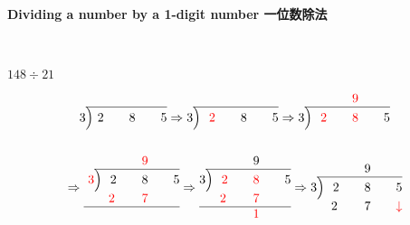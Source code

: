 \paragraph{Dividing a number by a 1-digit number 一位数除法}
\ \ 

\begin{example}
$148\div 21$
\end{example}
\begin{solution}
$$
\arraycolsep=0pt
\begin{array}{rccc}
&&&\\
\cline{2-4}
3&{\Big)}\ 2\quad&\quad8\quad&\quad5\\
&&&
\end{array}
\Rightarrow
\begin{array}{rccc}
&&&\\
\cline{2-4}
3&{\Big)}\ {\color{red}\ 2}\quad&\quad8\quad&\quad5\\
&&&
\end{array}
\Rightarrow
\begin{array}{rccc}
&&\quad {\color{red}9}\quad&\\
\cline{2-4}
3&{\Big)}\ {\color{red}\ 2}\quad&\quad{\color{red}8}\quad&\quad5\\
&&&
\end{array}
$$
$$
\arraycolsep=0pt
\Rightarrow
\begin{array}{rccc}
&&\quad {\color{red}9}\quad&\\
\cline{2-4}
{\color{red}\ 3}&{\Big)}\ \ 2\quad&\quad8\quad&\quad5\\
&\quad{\color{red}2}\quad&\quad{\color{red}7}\quad&\\
\hline
&&&
\end{array}
\Rightarrow
\begin{array}{rccc}
&&\quad 9\quad&\\
\cline{2-4}
3&{\Big)}\ \ {\color{red}2}\quad&\quad{\color{red}8}\quad&\quad5\\
&\quad{\color{red}2}\quad&\quad{\color{red}7}\quad&\\
\hline
&&\quad{\color{red}1}\quad&
\end{array}
\Rightarrow
\begin{array}{rccc}
&&\quad 9\quad&\\
\cline{2-4}
3&{\Big)}\ \ 2\quad&\quad8\quad&\quad5\\
&\quad2\quad&\quad7\quad&\quad{\color{red} \downarrow}\\

\end{array}$$
\end{solution}
